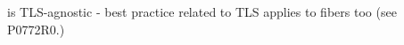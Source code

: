 
\fiber is TLS-agnostic - best practice related to TLS applies to fibers too
(see P0772R0.)\\

%
%
%
